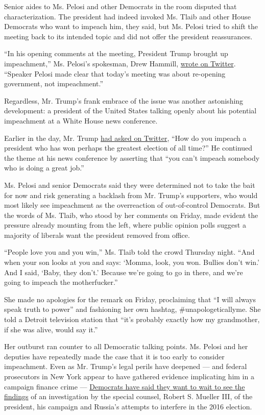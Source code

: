 Senior aides to Ms. Pelosi and other Democrats in the room disputed that
characterization. The president had indeed invoked Ms. Tlaib and other
House Democrats who want to impeach him, they said, but Ms. Pelosi tried
to shift the meeting back to its intended topic and did not offer the
president reassurances.

``In his opening comments at the meeting, President Trump brought up
impeachment,'' Ms. Pelosi's spokesman, Drew Hammill,
\href{https://twitter.com/Drew_Hammill/status/1081283127451049985}{wrote
on Twitter}. ``Speaker Pelosi made clear that today's meeting was about
re-opening government, not impeachment.''

Regardless, Mr. Trump's frank embrace of the issue was another
astonishing development: a president of the United States talking openly
about his potential impeachment at a White House news conference.

Earlier in the day, Mr. Trump
\href{https://twitter.com/realDonaldTrump/status/1081177511592108032}{had
asked on Twitter}, ``How do you impeach a president who has won perhaps
the greatest election of all time?'' He continued the theme at his news
conference by asserting that ``you can't impeach somebody who is doing a
great job.''

Ms. Pelosi and senior Democrats said they were determined not to take
the bait for now and risk generating a backlash from Mr. Trump's
supporters, who would most likely see impeachment as the overreaction of
out-of-control Democrats. But the words of Ms. Tlaib, who stood by her
comments on Friday, made evident the pressure already mounting from the
left, where public opinion polls suggest a majority of liberals want the
president removed from office.

``People love you and you win,'' Ms. Tlaib told the crowd Thursday
night. ``And when your son looks at you and says: `Momma, look, you won.
Bullies don't win.' And I said, `Baby, they don't.' Because we're going
to go in there, and we're going to impeach the motherfucker.''

She made no apologies for the remark on Friday, proclaiming that ``I
will always speak truth to power'' and fashioning her own hashtag,
\#unapologeticallyme. She told a Detroit television station that ``it's
probably exactly how my grandmother, if she was alive, would say it.''

Her outburst ran counter to all Democratic talking points. Ms. Pelosi
and her deputies have repeatedly made the case that it is too early to
consider impeachment. Even as Mr. Trump's legal perils have deepened ---
and federal prosecutors in New York appear to have gathered evidence
implicating him in a campaign finance crime ---
\href{https://www.nytimes3xbfgragh.onion/2018/11/30/us/politics/jerrold-nadler-trump-impeachment.html}{Democrats
have said they want to wait to see the findings} of an investigation by
the special counsel, Robert S. Mueller III, of the president, his
campaign and Russia's attempts to interfere in the 2016 election.

